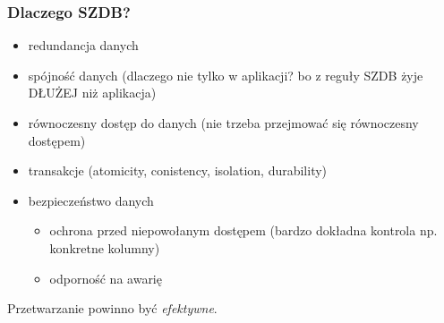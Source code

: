 \documentclass[12pt]{article}
\begin{document}
\subsubsection{Dlaczego SZDB?}
\begin{itemize}
\item redundancja danych
\item spójność danych (dlaczego nie tylko w aplikacji? bo z reguły SZDB żyje DŁUŻEJ niż aplikacja)
\item równoczesny dostęp do danych (nie trzeba przejmować się równoczesny dostępem)
\item transakcje (atomicity, conistency, isolation, durability)
\item bezpieczeństwo danych
\begin{itemize}
\item ochrona przed niepowołanym dostępem (bardzo dokładna kontrola np. konkretne kolumny)
\item odporność na awarię
\end{itemize}
\end{itemize}
Przetwarzanie powinno być \emph{efektywne}.
\end{document}
